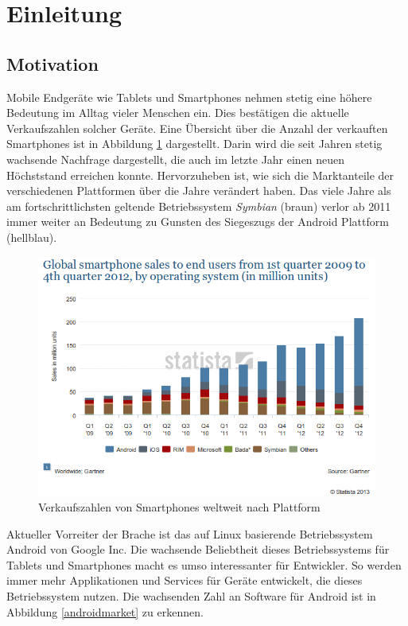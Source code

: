 \section{Einleitung}

\subsection{Motivation}

Mobile Endgeräte wie Tablets und Smartphones nehmen stetig eine höhere Bedeutung im Alltag vieler Menschen ein. Dies bestätigen die aktuelle Verkaufszahlen solcher Geräte. Eine Übersicht über die Anzahl der verkauften Smartphones ist in Abbildung \ref{sale1}\cite{stat_1} dargestellt. Darin wird die seit Jahren stetig wachsende Nachfrage dargestellt, die auch im letzte Jahr einen neuen Höchststand erreichen konnte. Hervorzuheben ist, wie sich die Marktanteile der verschiedenen Plattformen über die Jahre verändert haben. Das viele Jahre als am fortschrittlichsten geltende Betriebssystem \emph{Symbian} (braun) verlor ab 2011 immer weiter an Bedeutung zu Gunsten des Siegeszugs der Android Plattform (hellblau).

\begin{figure}[h!t]
\begin{center}
\includegraphics[scale=0.6]{images/sale}
\caption{Verkaufszahlen von Smartphones weltweit nach Plattform}
\label{sale1}
\end{center}
\end{figure}

Aktueller Vorreiter der Brache ist das auf Linux basierende Betriebssystem Android von Google Inc. Die wachsende Beliebtheit dieses Betriebssystems für Tablets und Smartphones macht es umso interessanter für Entwickler. So werden immer mehr Applikationen und Services für Geräte entwickelt, die dieses Betriebssystem nutzen. Die wachsenden Zahl an Software für Android ist in Abbildung \ref*{androidmarket}\cite{stat_2} zu erkennen. 


